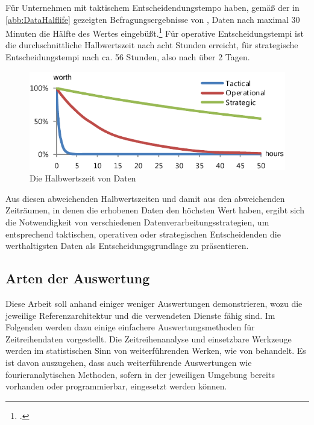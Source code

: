 Für Unternehmen mit taktischem Entscheidendungstempo haben, gemäß der in \autoref{abb:DataHalflife} gezeigten Befragungsergebnisse von \citeauthor{NucleusResarchInc..2012}, Daten nach maximal 30 Minuten die Hälfte des Wertes eingebüßt.\footcite[Vgl. auch im Folgenden][6]{NucleusResarchInc..2012} Für operative Entscheidungstempi ist die durchschnittliche Halbwertszeit nach acht Stunden erreicht, für strategische Entscheidungstempi nach ca. 56 Stunden, also nach über 2 Tagen.



\begin{figure}[H]
\centering
\includegraphics[width=\textwidth]{graphics/half-life-data.pdf}
\caption[Die Halbwertszeit von Daten]{Die Halbwertszeit von Daten\footnotemark}
\label{abb:DataHalflife}
\end{figure}
Aus diesen abweichenden Halbwertszeiten und damit aus den abweichenden Zeiträumen, in denen die erhobenen Daten den höchsten Wert haben, ergibt sich die Notwendigkeit von verschiedenen Datenverarbeitungsstrategien, um entsprechend taktischen, operativen oder strategischen  Entscheidenden die werthaltigsten Daten als Entscheidungsgrundlage zu präsentieren.

\subsection{Arten der Auswertung}\label{chap:auswertungsarten}
Diese Arbeit soll anhand einiger weniger Auswertungen demonstrieren, wozu die jeweilige Referenzarchitektur und die verwendeten Dienste fähig sind. Im Folgenden werden dazu einige einfachere Auswertungsmethoden für Zeitreihendaten vorgestellt. Die Zeitreihenanalyse und einsetzbare Werkzeuge werden im statistischen Sinn von weiterführenden Werken, wie von \citeauthor{Shumway.2017} behandelt. Es ist davon auszugehen, dass auch weiterführende Auswertungen wie fourieranalytischen Methoden, sofern in der jeweiligen Umgebung bereits vorhanden oder programmierbar, eingesetzt werden können.

